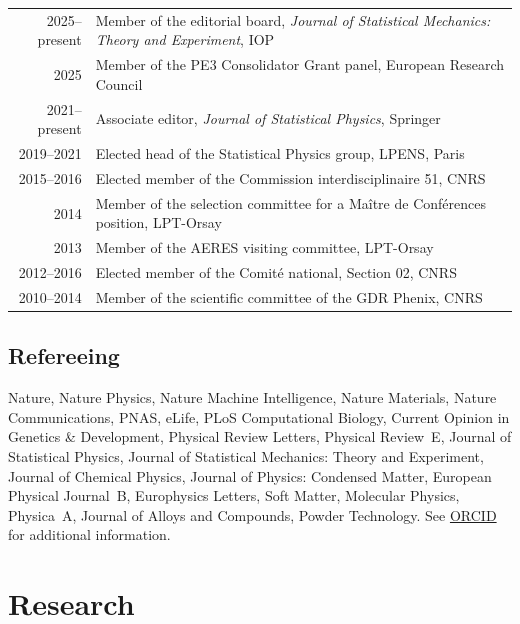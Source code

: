\documentclass[a4paper,10pt]{article}
\begin{document}
\begin{tabularx}{\textwidth}{@{}D L@{}}
2025--present & Member of the editorial board, \emph{Journal of Statistical Mechanics: Theory and Experiment}, IOP \\
2025 & Member of the PE3 Consolidator Grant panel, European Research Council \\
2021--present & Associate editor, \emph{Journal of Statistical Physics}, Springer \\
2019--2021 & Elected head of the Statistical Physics group, LPENS, Paris \\
2015--2016 & Elected member of the Commission interdisciplinaire 51, CNRS \\
2014 & Member of the selection committee for a Maître de Conférences position, LPT-Orsay \\
2013 & Member of the AERES visiting committee, LPT-Orsay \\
2012--2016 & Elected member of the Comité national, Section 02, CNRS \\
2010--2014 & Member of the scientific committee of the GDR Phenix, CNRS \\
\end{tabularx}

\subsection{Refereeing}
\vspace{2pt}
{\small Nature, Nature Physics, Nature Machine Intelligence, Nature Materials, Nature Communications, PNAS, eLife,
PLoS Computational Biology, Current Opinion in Genetics \& Development, Physical Review Letters, Physical Review~E,
Journal of Statistical Physics, Journal of Statistical Mechanics: Theory and Experiment, Journal of Chemical Physics,
Journal of Physics: Condensed Matter, European Physical Journal~B, Europhysics Letters, Soft Matter, Molecular Physics,
Physica~A, Journal of Alloys and Compounds, Powder Technology.
See \href{https://orcid.org/0000-0001-9260-1951}{ORCID} for additional information.}

\section{Research}
\end{document}
